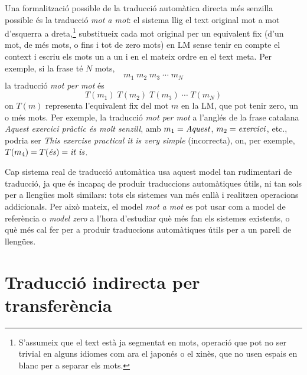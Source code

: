 Una formalització possible de la traducció automàtica directa més
senzilla possible és la traducció \emph{mot a mot}: el sistema llig el
text original mot a mot d'esquerra a dreta,\footnote{S'assumeix que el
  text està ja segmentat en mots, operació que pot no ser trivial en
  alguns idiomes com ara el japonés o el xinès, que no usen espais en
  blanc per a separar els mots.} substitueix cada mot original per un
equivalent fix (d'un mot, de més mots, o fins i tot de zero mots) en
LM sense tenir en compte el context i escriu els mots un a un i en el
mateix ordre en el text meta.  Per exemple, si la frase té \(N\) mots,
\begin{displaymath}
  m_1\; m_2\; m_3\; \cdots \;m_N
\end{displaymath}
la traducció \emph{mot per mot} és
\begin{displaymath}
  T(m_1)\; T(m_2)\; T(m_3)\; \cdots\; T(m_N)
\end{displaymath}
on \(T(m)\) representa l'equivalent fix del mot \(m\) en la LM, que
pot tenir zero, un o més mots. Per exemple, la traducció \emph{mot per
  mot} a l'anglés de la frase catalana \emph{Aquest exercici pràctic
  és molt senzill}, amb \(m_1=\mbox{\emph{Aquest}}\),
\(m_2=\mbox{\emph{exercici}}\), etc., podria ser \emph{This exercise
  practical it is very simple} (incorrecta), on, per exemple,
\(T(m_4)=T(\mbox{\emph{és}})=\mbox{\emph{it is}}\).

Cap sistema real de traducció automàtica usa aquest model tan
rudimentari de traducció, ja que és incapaç de produir traduccions
automàtiques útils, ni tan sols per a llengües molt similars: tots els
sistemes van més enllà i realitzen operacions addicionals. Per això
mateix, el model \emph{mot a mot} es pot usar com a model de
referència o \emph{model zero} a l'hora d'estudiar què més fan els
sistemes existents, o què més cal fer per a produir traduccions
automàtiques útils per a un parell de llengües.

 
\section{Traducció indirecta per transferència}
\label{ss:classtrans}

